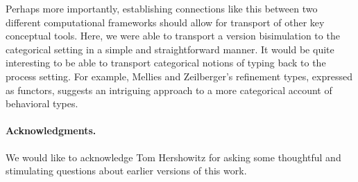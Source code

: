 \documentclass[]{acm_proc_article-sp}
\numberwithin{equation}{subsection}
\begin{document}
Perhaps more importantly, establishing connections like this between
two different computational frameworks should allow for transport of
other key conceptual tools. Here, we were able to transport a version
bisimulation to the categorical setting in a simple and
straightforward manner. It would be quite interesting to be able to
transport categorical notions of typing back to the process
setting. For example, Mellies and Zeilberger's refinement types,
expressed as functors, suggests an intriguing approach to a more
categorical account of behavioral types.

\paragraph{Acknowledgments.}
We would like to acknowledge Tom Hershowitz for asking some thoughtful
and stimulating questions about earlier versions of this work.







\end{document}
